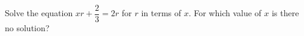 Solve the equation $xr+\dfrac23=2r$ for $r$ in terms of $x$. For which value of $x$ is there no solution?
